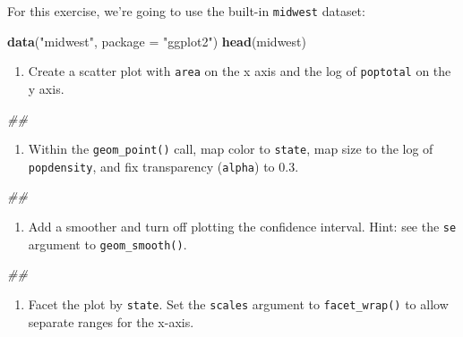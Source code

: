 \documentclass[]{book}
\newenvironment{Shaded}{\begin{snugshade}}{\end{snugshade}}
\newcommand{\CommentTok}[1]{\textcolor[rgb]{0.56,0.35,0.01}{\textit{#1}}}
\newcommand{\DataTypeTok}[1]{\textcolor[rgb]{0.13,0.29,0.53}{#1}}
\newcommand{\KeywordTok}[1]{\textcolor[rgb]{0.13,0.29,0.53}{\textbf{#1}}}
\newcommand{\NormalTok}[1]{#1}
\newcommand{\StringTok}[1]{\textcolor[rgb]{0.31,0.60,0.02}{#1}}
\providecommand{\tightlist}{%
  \setlength{\itemsep}{0pt}\setlength{\parskip}{0pt}}
\begin{document}
For this exercise, we're going to use the built-in \texttt{midwest} dataset:

\begin{Shaded}
\begin{Highlighting}[]
\KeywordTok{data}\NormalTok{(}\StringTok{"midwest"}\NormalTok{, }\DataTypeTok{package =} \StringTok{"ggplot2"}\NormalTok{)}
\KeywordTok{head}\NormalTok{(midwest)}
\end{Highlighting}
\end{Shaded}

\begin{enumerate}
\def\labelenumi{\arabic{enumi}.}
\tightlist
\item
  Create a scatter plot with \texttt{area} on the x axis and the log of \texttt{poptotal} on the y axis.
\end{enumerate}

\begin{Shaded}
\begin{Highlighting}[]
\CommentTok{## }
\end{Highlighting}
\end{Shaded}

\begin{enumerate}
\def\labelenumi{\arabic{enumi}.}
\setcounter{enumi}{1}
\tightlist
\item
  Within the \texttt{geom\_point()} call, map color to \texttt{state}, map size to the log of \texttt{popdensity}, and fix transparency (\texttt{alpha}) to 0.3.
\end{enumerate}

\begin{Shaded}
\begin{Highlighting}[]
\CommentTok{## }
\end{Highlighting}
\end{Shaded}

\begin{enumerate}
\def\labelenumi{\arabic{enumi}.}
\setcounter{enumi}{2}
\tightlist
\item
  Add a smoother and turn off plotting the confidence interval. Hint: see the \texttt{se} argument to \texttt{geom\_smooth()}.
\end{enumerate}

\begin{Shaded}
\begin{Highlighting}[]
\CommentTok{## }
\end{Highlighting}
\end{Shaded}

\begin{enumerate}
\def\labelenumi{\arabic{enumi}.}
\setcounter{enumi}{3}
\tightlist
\item
  Facet the plot by \texttt{state}. Set the \texttt{scales} argument to \texttt{facet\_wrap()} to allow separate ranges for the x-axis.
\end{enumerate}
\end{document}
